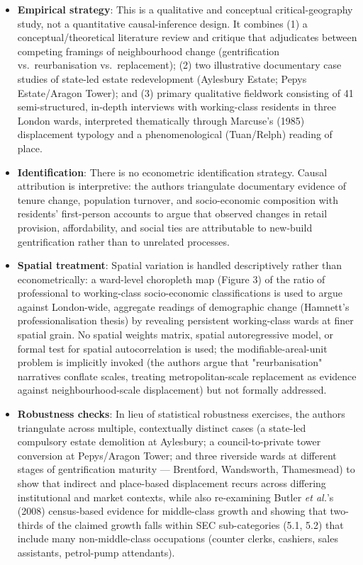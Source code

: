 \begin{itemize}
  \item \textbf{Empirical strategy}: This is a qualitative and conceptual critical-geography study, not a quantitative causal-inference design. It combines (1) a conceptual/theoretical literature review and critique that adjudicates between competing framings of neighbourhood change (gentrification vs.\ reurbanisation vs.\ replacement); (2) two illustrative documentary case studies of state-led estate redevelopment (Aylesbury Estate; Pepys Estate/Aragon Tower); and (3) primary qualitative fieldwork consisting of 41 semi-structured, in-depth interviews with working-class residents in three London wards, interpreted thematically through Marcuse's (1985) displacement typology and a phenomenological (Tuan/Relph) reading of place.
  \item \textbf{Identification}: There is no econometric identification strategy. Causal attribution is interpretive: the authors triangulate documentary evidence of tenure change, population turnover, and socio-economic composition with residents' first-person accounts to argue that observed changes in retail provision, affordability, and social ties are attributable to new-build gentrification rather than to unrelated processes.
  \item \textbf{Spatial treatment}: Spatial variation is handled descriptively rather than econometrically: a ward-level choropleth map (Figure 3) of the ratio of professional to working-class socio-economic classifications is used to argue against London-wide, aggregate readings of demographic change (Hamnett's professionalisation thesis) by revealing persistent working-class wards at finer spatial grain. No spatial weights matrix, spatial autoregressive model, or formal test for spatial autocorrelation is used; the modifiable-areal-unit problem is implicitly invoked (the authors argue that "reurbanisation" narratives conflate scales, treating metropolitan-scale replacement as evidence against neighbourhood-scale displacement) but not formally addressed.
  \item \textbf{Robustness checks}: In lieu of statistical robustness exercises, the authors triangulate across multiple, contextually distinct cases (a state-led compulsory estate demolition at Aylesbury; a council-to-private tower conversion at Pepys/Aragon Tower; and three riverside wards at different stages of gentrification maturity --- Brentford, Wandsworth, Thamesmead) to show that indirect and place-based displacement recurs across differing institutional and market contexts, while also re-examining Butler \textit{et al.}'s (2008) census-based evidence for middle-class growth and showing that two-thirds of the claimed growth falls within SEC sub-categories (5.1, 5.2) that include many non-middle-class occupations (counter clerks, cashiers, sales assistants, petrol-pump attendants).

\end{itemize}
